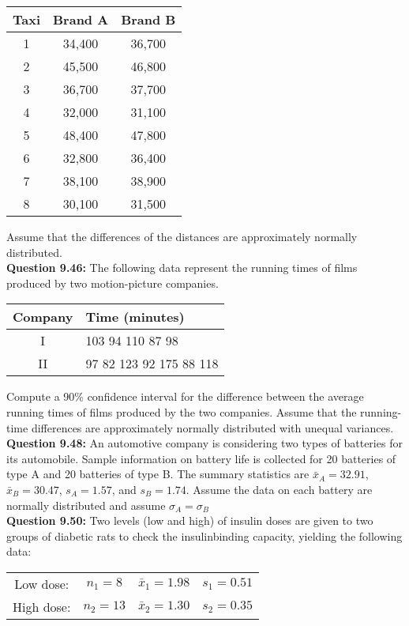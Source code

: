 \documentclass{article}
\begin{document}
\begin{center}
    \begin{tabular}{c c c}
        Taxi  & Brand A & Brand B\\
        \hline
        1 & 34,400 & 36,700 \\
        2 & 45,500 & 46,800 \\
        3 & 36,700 & 37,700 \\
        4 & 32,000 & 31,100 \\
        5 & 48,400 & 47,800 \\
        6 & 32,800 & 36,400 \\
        7 & 38,100 & 38,900 \\
        8 & 30,100 & 31,500 \\
    \end{tabular}
\end{center}
Assume that the differences of the distances are 
approximately normally distributed.\\\newline
\textbf{Question 9.46:}
The following data represent the running times
of films produced by two motion-picture companies.
\begin{center}
\begin{tabular}{c | l}
    Company & Time (minutes)\\
    \hline
    I & 103 94 110 87 98 \\
    II & 97 82 123 92 175 88 118
\end{tabular}
\end{center}
Compute a 90\% confidence interval for the difference
between the average running times of films produced by
the two companies. Assume that the running-time 
differences are approximately normally distributed with
unequal variances.\\\newline
\textbf{Question 9.48:}
An automotive company is considering two
types of batteries for its automobile. Sample information 
on battery life is collected for 20 batteries of
type A and 20 batteries of type B. The summary
statistics are $\bar{x}_A = 32.91$, $\bar{x}_B = 30.47$, $s_A = 1.57$,
and $s_B = 1.74$. Assume the data on each battery are
normally distributed and assume $\sigma_A = \sigma_B$\\\newline
\textbf{Question 9.50:}
Two levels (low and high) of insulin doses are
given to two groups of diabetic rats to check the 
insulinbinding capacity, yielding the following data:
\begin{center}
\begin{tabular}{c c c c}
    Low dose: & $n_1 = 8$ & $\bar{x}_1 = 1.98$ & $s_1 = 0.51$ \\
    High dose: & $n_2 = 13$ & $\bar{x}_2 = 1.30$ & $s_2 = 0.35$
\end{tabular}
\end{center}
\end{document}
